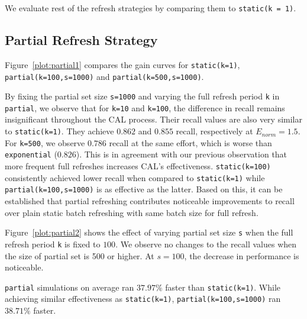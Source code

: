 We evaluate rest of the refresh strategies by comparing them to
\texttt{static(k = 1)}.

\subsection*{Partial Refresh Strategy}
Figure~\ref{plot:partial1} compares the gain curves for
\texttt{static(k=1)}, \texttt{partial(k=100,s=1000)} and
\texttt{partial(k=500,s=1000)}.

By fixing the partial set size \texttt{s=1000} and varying the full refresh
period \texttt{k} in \texttt{partial}, we observe
that for \texttt{k=10} and \texttt{k=100}, the difference in recall remains insignificant throughout the
CAL process. Their recall values are also very similar to
\texttt{static(k=1)}. They achieve $0.862$ and $0.855$ recall, respectively at
$E_{norm} = 1.5$. For \texttt{k=500}, we observe $0.786$ recall at the
same effort, which is worse than \texttt{exponential} ($0.826$). This is in
agreement with our previous observation that more frequent full refreshes
increases CAL's effectiveness. \texttt{static(k=100)}
consistently achieved lower recall when compared to \texttt{static(k=1)} while
\texttt{partial(k=100,s=1000)} is as effective as the latter. Based
on this, it can be established that partial refreshing contributes noticeable
improvements to recall over plain static batch refreshing with same batch size
for full refresh.

Figure~\ref{plot:partial2} shows the effect of varying partial set size
\texttt{s} when the full refresh period \texttt{k} is fixed to $100$. We observe
no changes to the recall values when the size of partial set is 500 or higher. At
$s=100$, the decrease in performance is noticeable.

\texttt{partial} simulations on average ran $37.97\%$ faster than
\texttt{static(k=1)}. While achieving similar effectiveness as 
\texttt{static(k=1)}, \texttt{partial(k=100,s=1000)} ran $38.71\%$ faster.


